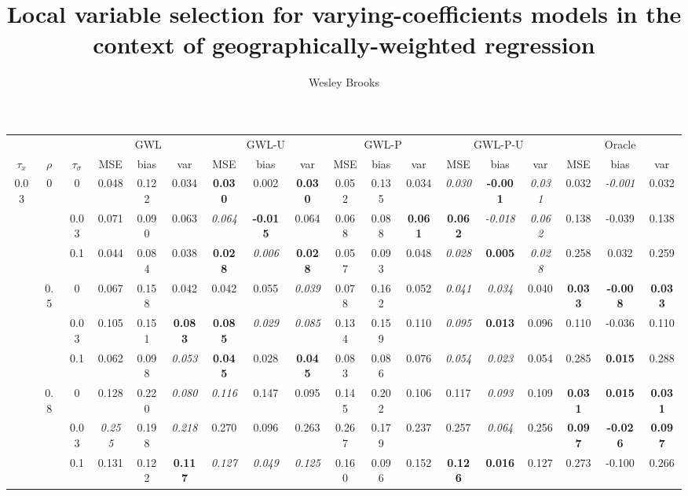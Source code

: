 \documentclass[authoryear, review, 10pt]{elsarticle}
\title{Local variable selection for varying-coefficients models in the context of geographically-weighted regression}
\author{Wesley Brooks}
\date{}                                           %
\begin{document}
\begin{sidewaystable}[ht]
\begin{center}
\begin{tabular}{ccc|ccc|ccc|ccc|ccc|ccc}
&&&\multicolumn{3}{c}{GWL}&\multicolumn{3}{c}{GWL-U}&\multicolumn{3}{c}{GWL-P}&\multicolumn{3}{c}{GWL-P-U}&\multicolumn{3}{c}{Oracle}\\
$\tau_x$ & $\rho$ & $\tau_\sigma$ & MSE & bias & var &  MSE & bias & var &  MSE & bias & var &  MSE & bias & var &  MSE & bias & var\\ 
\hline
\multirow{9}{*}{0.03} & \multirow{3}{*}{0} & 0 & 0.048 & 0.122 & 0.034 & \textbf{0.030} & 0.002 & \textbf{0.030} & 0.052 & 0.135 & 0.034 & \emph{0.030} & \textbf{-0.001} & \emph{0.031} & 0.032 & \emph{-0.001} & 0.032 \\ 
 &  & 0.03 &   0.071 & 0.090 & 0.063 & \emph{0.064} & \textbf{-0.015} & 0.064 & 0.068 & 0.088 & \textbf{0.061} & \textbf{0.062} & \emph{-0.018} & \emph{0.062} & 0.138 & -0.039 & 0.138 \\ 
 &  & 0.1 &   0.044 & 0.084 & 0.038 & \textbf{0.028} & \emph{0.006} & \textbf{0.028} & 0.057 & 0.093 & 0.048 & \emph{0.028} & \textbf{0.005} & \emph{0.028} & 0.258 & 0.032 & 0.259 \\ \cline{2-18}
 & \multirow{3}{*}{0.5} & 0 &   0.067 & 0.158 & 0.042 & 0.042 & 0.055 & \emph{0.039} & 0.078 & 0.162 & 0.052 & \emph{0.041} & \emph{0.034} & 0.040 & \textbf{0.033} & \textbf{-0.008} & \textbf{0.033} \\ 
 &  & 0.03 &   0.105 & 0.151 & \textbf{0.083} & \textbf{0.085} & \emph{0.029} & \emph{0.085} & 0.134 & 0.159 & 0.110 & \emph{0.095} & \textbf{0.013} & 0.096 & 0.110 & -0.036 & 0.110 \\ 
 &  & 0.1 &   0.062 & 0.098 & \emph{0.053} & \textbf{0.045} & 0.028 & \textbf{0.045} & 0.083 & 0.086 & 0.076 & \emph{0.054} & \emph{0.023} & 0.054 & 0.285 & \textbf{0.015} & 0.288 \\ \cline{2-18}
 & \multirow{3}{*}{0.8} & 0 &   0.128 & 0.220 & \emph{0.080} & \emph{0.116} & 0.147 & 0.095 & 0.145 & 0.202 & 0.106 & 0.117 & \emph{0.093} & 0.109 & \textbf{0.031} & \textbf{0.015} & \textbf{0.031} \\ 
 &  & 0.03 &   \emph{0.255} & 0.198 & \emph{0.218} & 0.270 & 0.096 & 0.263 & 0.267 & 0.179 & 0.237 & 0.257 & \emph{0.064} & 0.256 & \textbf{0.097} & \textbf{-0.026} & \textbf{0.097} \\ 
 &  & 0.1 &   0.131 & 0.122 & \textbf{0.117} & \emph{0.127} & \emph{0.049} & \emph{0.125} & 0.160 & 0.096 & 0.152 & \textbf{0.126} & \textbf{0.016} & 0.127 & 0.273 & -0.100 & 0.266 \\ \cline{1-18}

\end{tabular}
\end{center}
\end{sidewaystable}
\end{document}
